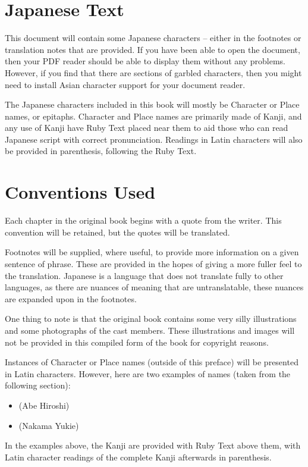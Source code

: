 \section*{Japanese Text}
This document will contain some Japanese characters -- either in the footnotes or translation notes that are provided. If you have been able to open the document, then your PDF reader should be able to display them without any problems. However, if you find that there are sections of garbled characters, then you might need to install Asian character support for your document reader.

\par The Japanese characters included in this book will mostly be Character or Place names, or epitaphs. Character and Place names are primarily made of Kanji, and any use of Kanji have Ruby Text placed near them to aid those who can read Japanese script with correct pronunciation. Readings in Latin characters will also be provided in parenthesis, following the Ruby Text.

\section*{Conventions Used}
Each chapter in the original book begins with a quote from the writer. This convention will be retained, but the quotes will be translated.
\par Footnotes will be supplied, where useful, to provide more information on a given sentence of phrase. These are provided in the hopes of giving a more fuller feel to the translation. Japanese is a language that does not translate fully to other languages, as there are nuances of meaning that are untranslatable, these nuances are expanded upon in the footnotes.
\par One thing to note is that the original book contains some very silly illustrations and some photographs of the cast members. These illustrations and images will not be provided in this compiled form of the book for copyright reasons.
\par Instances of Character or Place names (outside of this preface) will be presented in Latin characters. However, here are two examples of names (taken from the following section):
\begin{itemize}
	\item {} (Abe Hiroshi)
	\item {} (Nakama Yukie)
\end{itemize}
In the examples above, the Kanji are provided with Ruby Text above them, with Latin character readings of the complete Kanji afterwards in parenthesis.

\theendnotes